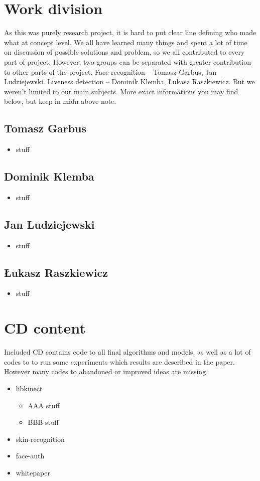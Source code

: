 \chapter{Work division}
    As this was purely research project, it is hard to
    put clear line defining who made what at concept level.
    We all have learned many things and spent a lot of time
    on discussion of possible solutions and problem,
    so we all contributed to every part of project.
    However, two groups can be separated
    with greater contribution to other parts of the project.
    Face recognition -- Tomasz Garbus, Jan Ludziejewski.
    Liveness detection -- Dominik Klemba, Łukasz Raszkiewicz.
    But we weren't limited to our main subjects.
    More exact informations you may find below,
    but keep in midn above note.

    \section{Tomasz Garbus}
        \begin{itemize}
            \item stuff
        \end{itemize}

    \section{Dominik Klemba}
        \begin{itemize}
            \item stuff
        \end{itemize}

    \section{Jan Ludziejewski}
        \begin{itemize}
            \item stuff
        \end{itemize}

    \section{Łukasz Raszkiewicz}
        \begin{itemize}
            \item stuff
        \end{itemize}



\chapter{CD content}
    Included CD contains code to all final algorithms
    and models, as well as a lot of codes to
    to run some experiments which results are described in the paper.
    However many codes to abandoned or improved ideas are missing.

    \begin{itemize}
        \item libkinect
        \begin{itemize}
            \item AAA stuff
            \item BBB stuff
        \end{itemize}
        \item skin-recognition
        \item face-auth
        \item whitepaper
    \end{itemize}

